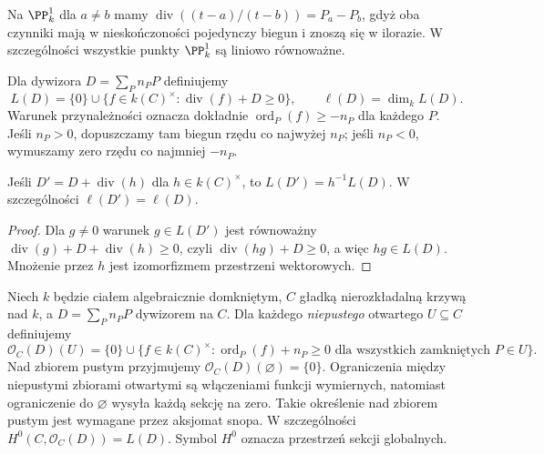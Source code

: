 \begin{przyklad}
Na $\PP^1_k$ dla $a\ne b$ mamy
$\operatorname{div}((t-a)/(t-b))=P_a-P_b$,
gdyż oba czynniki mają w nieskończoności
pojedynczy biegun i znoszą się w ilorazie.
W szczególności wszystkie punkty $\PP^1_k$
są liniowo równoważne.
\end{przyklad}

\begin{definicja}
Dla dywizora $D=\sum_Pn_PP$ definiujemy
\[
 L(D)=\{0\}\cup\{f\in k(C)^\times:
 \operatorname{div}(f)+D\ge0\},\qquad
 \ell(D)=\dim_k L(D).
\]
Warunek przynależności oznacza dokładnie
$\operatorname{ord}_P(f)\ge-n_P$ dla każdego $P$.
Jeśli $n_P>0$, dopuszczamy tam biegun rzędu
co najwyżej $n_P$; jeśli $n_P<0$, wymuszamy
zero rzędu co najmniej $-n_P$.
\end{definicja}

\begin{stwierdzenie}
Jeśli $D'=D+\operatorname{div}(h)$ dla
$h\in k(C)^\times$, to
$L(D')=h^{-1}L(D)$. W szczególności
$\ell(D')=\ell(D)$.
\end{stwierdzenie}
\begin{proof}
Dla $g\ne0$ warunek $g\in L(D')$ jest równoważny
$\operatorname{div}(g)+D+\operatorname{div}(h)\ge0$,
czyli $\operatorname{div}(hg)+D\ge0$, a więc
$hg\in L(D)$. Mnożenie przez $h$ jest
izomorfizmem przestrzeni wektorowych.
\end{proof}

\begin{definicja}
\label{def:O-D}
Niech $k$ będzie ciałem algebraicznie domkniętym,
$C$ gładką nierozkładalną krzywą nad $k$,
a $D=\sum_Pn_PP$ dywizorem na $C$.
Dla każdego \emph{niepustego} otwartego $U\subseteq C$
definiujemy
\[
 \mathcal O_C(D)(U)=\{0\}\cup\{f\in k(C)^\times:
 \operatorname{ord}_P(f)+n_P\ge0
 \text{ dla wszystkich zamkniętych }P\in U\}.
\]
Nad zbiorem pustym przyjmujemy
$\mathcal O_C(D)(\varnothing)=\{0\}$.
Ograniczenia między niepustymi zbiorami otwartymi
są włączeniami funkcji wymiernych, natomiast
ograniczenie do $\varnothing$ wysyła każdą sekcję
na zero. Takie określenie nad zbiorem pustym
jest wymagane przez aksjomat snopa.
W szczególności $H^0(C,\mathcal O_C(D))=L(D)$.
Symbol $H^0$ oznacza przestrzeń sekcji globalnych.
\end{definicja}

